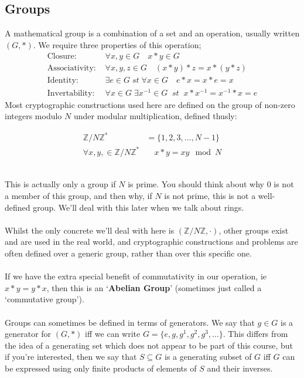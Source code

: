     \subsection{Groups}
    A mathematical group is a combination of a set and an operation, usually written $(G,*)$. We require three properties of this operation;
	\begin{align*}
		\mbox{Closure: } &\forall x,y \in G \quad x*y \in G\\
		\mbox{Associativity: } &\forall x,y,z \in G \quad (x*y)*z = x*(y*z)\\
		\mbox{Identity: } &\exists e \in G \; st \; \forall x \in G \quad e*x = x*e = x \\
		\mbox{Invertability: } &\forall x \in G \; \exists x^{-1} \in G \;\; st \;\; x*x^{-1} = x^{-1} * x = e
	\end{align*}
	Most cryptographic constructions used here are defined on the group of non-zero integers modulo $N$ under modular multiplication, defined thusly:
    \begin{figure}[htp!]
    \begin{align*}
        \mathbb{Z}/N\mathbb{Z}^{*} &= \{1, 2, 3, ... , N-1\} \\
        \forall x,y, \in \mathbb{Z}/N\mathbb{Z}^{*}& \quad x * y = xy \mod N
    \end{align*}
    \end{figure}\\
    This is actually only a group if $N$ is prime. You should think about why $0$ is not a member of this group, and then why, if $N$ is not prime, this is not a well-defined group. We'll deal with this later when we talk about rings.\\
\\
	Whilst the only concrete we'll deal with here is $(\mathbb{Z}/N\mathbb{Z} , \cdot)$, other groups exist and are used in the real world, and cryptographic constructions and problems are often defined over a generic group, rather than over this specific one.\\
\\
	If we have the extra special benefit of commutativity in our operation, ie $x*y = y*x$, then this is an `\textbf{Abelian Group}' (sometimes just called a `commutative group').\\
\\
    Groups can sometimes be defined in terms of generators. We say that $g \in G$ is a generator for $(G,*)$ iff we can write $G = \{e,g,g^1,g^2,g^3,...\}$. This differs from the idea of a generating set which does not appear to be part of this course, but if you're interested, then we say that $S\subseteq G$ is a generating subset of $G$ iff $G$ can be expressed using only finite products of elements of $S$ and their inverses.

